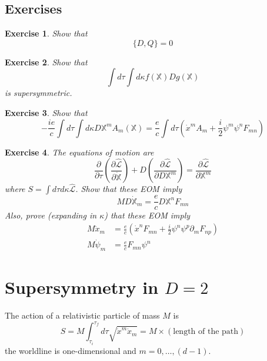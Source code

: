 \documentclass[a4paper,12pt]{article}
\newtheorem{exe}{Exercise}
\numberwithin{equation}{section}
\numberwithin{exe}{section}
\newcommand{\X}{{\mathbb X}}
\newcommand{\lag}{{\mathcal L}}
\newcommand{\p}{{\partial}}
\newcommand{\xd}{{\dot x}}
\renewcommand{\k}{{\kappa}}
\begin{document}
\subsection{Exercises}

	\begin{exe}
	Show that
		\begin{equation}
		\{D, Q\} = 0
		\end{equation}
	\end{exe}

	\begin{exe}
	Show that
		\begin{equation}
		\int d\tau \int d\k f(\X) Dg(\X)
		\end{equation}
	is supersymmetric.
	\end{exe}

	\begin{exe}
	Show that
		\begin{equation}
		-\frac{ie}{c} \int d\tau \int d\k D\X^m A_m(\X) = \frac{e}{c} \int d\tau (\dot x^m A_m + \frac{i}{2} \psi^m \psi^n F_{mn})
		\end{equation}
	\end{exe}

	\begin{exe}
	The equations of motion are
		\begin{equation}
		\frac{\p}{\p\tau}\left(\frac{\p\hat\lag}{\p\dot\X}\right) + D\left(\frac{\p\hat\lag}{\p D\X^m}\right) = \frac{\p\hat\lag}{\p\X^m}
		\end{equation}
	where $S = \int d\tau d\k \hat\lag$. Show that these EOM imply
		\begin{equation}
		M D\dot\X_m = \frac{e}{c} D\X^n F_{mn}
		\end{equation}
	Also, prove (expanding in $\k$) that these EOM imply
		\begin{align}
		M \ddot x_m & = \frac{e}{c} (\dot x^n F_{mn} + \frac{i}{2} \psi^n\psi^p \p_m F_{np}) \\
		M \dot \psi_m & = \frac{e}{c} F_{mn} \psi^n
		\end{align}
	\end{exe}

\newpage


\section{Supersymmetry in $D=2$}

The action of a relativistic particle of mass $M$ is
	\begin{equation}
	S = M \int_{\tau_i}^{\tau_f} d\tau \sqrt{\xd^m \xd_m} = M\times (\text{length of the path})
	\end{equation}
the worldline is one-dimensional and $m=0,\ldots,(d-1)$.
\end{document}
